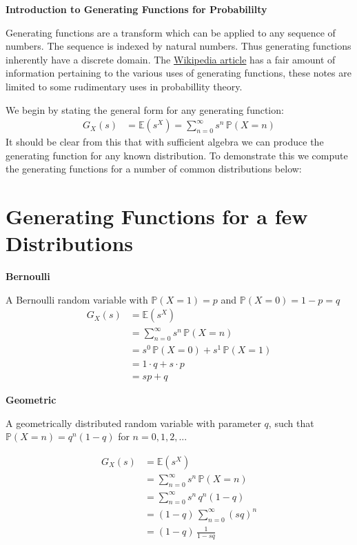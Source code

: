 \documentclass[11pt]{article}
\begin{document}
\begin{center}
{\LARGE \bf Introduction to Generating Functions for Probabililty} \\
\end{center}

Generating functions are a transform which can be applied to any sequence of numbers. The sequence is indexed by natural numbers. Thus generating functions inherently have a discrete domain. The \href{http://en.wikipedia.org/wiki/Generating_function}{Wikipedia article} has a fair amount of information pertaining to the various uses of generating functions, these notes are limited to some rudimentary uses in probabillity theory.

We begin by stating the general form for any generating function:
\begin{align}
G_X(s) &= \mathbb{E}(s^X) = \sum_{n=0}^{\infty} s^n\, \mathbb{P}(X=n) 
\end{align}
It should be clear from this that with sufficient algebra we can produce the generating function for any known distribution. To demonstrate this we compute the generating functions for a number of common distributions below:
\section{Generating Functions for a few Distributions}
{\bf Bernoulli}

A Bernoulli random variable with $\mathbb{P}(X=1) = p$ and $\mathbb{P}(X=0) = 1 - p = q$
\begin{align}
G_X(s) &= \mathbb{E}(s^X) \\
&= \sum_{n=0}^{\infty} s^n\, \mathbb{P}(X=n) \\
&= s^0\,\mathbb{P}(X=0) + s^1\,\mathbb{P}(X=1) \\
&= 1 \cdot q + s \cdot p \\
&= sp + q
\end{align}

{\bf Geometric}

A geometrically distributed random variable with parameter $q$, such that $\mathbb{P}(X=n) = q^n(1-q)$ for $n=0,1,2,...$

\begin{align}
G_X(s) &= \mathbb{E}(s^X) \\
&= \sum_{n=0}^{\infty} s^n\, \mathbb{P}(X=n) \\
&= \sum_{n=0}^{\infty} s^n\, q^n(1-q) \\
&= (1-q)\,\sum_{n=0}^{\infty} (sq)^n \\
&= (1-q)\,\frac{1}{1-sq}
\end{align}
\end{document}
